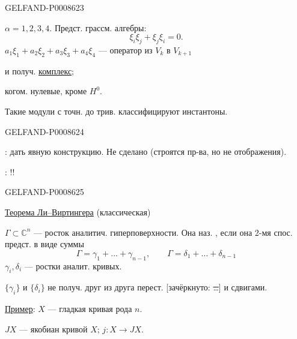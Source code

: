 \begin{GelfandAdjacentEvidence}{GELFAND-P000862}{3}

\(\alpha=1,2,3,4\). \quad Предст. грассм. алгебры:
\[
\xi_i\xi_j+\xi_j\xi_i=0.
\]
\(a_1\xi_1+a_2\xi_2+a_3\xi_3+a_4\xi_4\) — оператор из \(V_k\) в \(V_{k+1}\)

и получ. \uline{комплекс};

когом. нулевые, кроме \(H^0\).

Такие модули с точн. до трив. классифицируют инстантоны.
\end{GelfandAdjacentEvidence}
\begin{GelfandAdjacentEvidence}{GELFAND-P000862}{4}


: дать явную конструкцию. Не сделано (строятся пр-ва, но не отображения).

: !!

\end{GelfandAdjacentEvidence}
\begin{GelfandAdjacentEvidence}{GELFAND-P000862}{5}


\uline{Теорема Ли–Виртингера} (классическая)

\(\Gamma\subset\mathbb C^n\) — росток аналитич. гиперповерхности.
Она наз. , если она 2-мя спос. предст. в виде суммы
\[
\Gamma=\gamma_1+\ldots+\gamma_{n-1},
\qquad
\Gamma=\delta_1+\ldots+\delta_{n-1}
\]
\(\gamma_i,\delta_i\) — ростки аналит. кривых.

\(\{\gamma_i\}\) и \(\{\delta_i\}\) не получ. друг из друга перест.
[зачёркнуто: \sout{…}] и сдвигами.
\end{GelfandAdjacentEvidence}


\uline{Пример}: \(X\) — гладкая кривая рода \(n\).

\(JX\) — якобиан кривой \(X\); \quad \(j:X\longrightarrow JX\).


